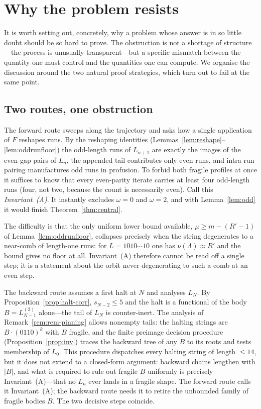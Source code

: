 \documentclass[11pt,reqno]{amsart}
\theoremstyle{plain}
\theoremstyle{definition}
\theoremstyle{remark}
\begin{document}
\section{Why the problem resists}\label{sec:resist}
It is worth setting out, concretely, why a problem whose answer is in so little doubt should be so hard to prove. The obstruction is not a shortage of structure---the process is unusually transparent---but a specific mismatch between the quantity one must control and the quantities one can compute. We organise the discussion around the two natural proof strategies, which turn out to fail at the same point.

\subsection{Two routes, one obstruction}\label{sec:13.1}
The forward route sweeps along the trajectory and asks how a single application of $F$ reshapes runs. By the reshaping identities (Lemmas~\ref{lem:reshape}--\ref{lem:oddrunfloor}) the odd-length runs of $L_{n+1}$ are exactly the images of the even-gap pairs of $L_n$, the appended tail contributes only even runs, and intra-run pairing manufactures odd runs in profusion. To forbid both fragile profiles at once it suffices to know that every even-parity iterate carries at least four odd-length runs (four, not two, because the count is necessarily even). Call this \emph{Invariant~(A)}. It instantly excludes $\omega=0$ and $\omega=2$, and with Lemma~\ref{lem:odd} it would finish Theorem~\ref{thm:central}.

The difficulty is that the only uniform lower bound available, $\mu\ge m-(R'-1)$ of Lemma~\ref{lem:oddrunfloor}, collapses precisely when the string degenerates to a near-comb of length-one runs: for $L=1010\cdots 10$ one has $\nu(\Lambda)\approx R'$ and the bound gives no floor at all. Invariant~(A) therefore cannot be read off a single step; it is a statement about the orbit never degenerating to such a comb at an even step.

The backward route assumes a first halt at $N$ and analyses $L_N$. By Proposition~\ref{prop:halt-corr}, $s_{N-2}\le 5$ and the halt is a functional of the body $B=L^{(2)}_{N-1}$ alone---the tail of $L_N$ is counter-inert. The analysis of Remark~\ref{rem:rem-pinning} allows nonempty tails: the halting strings are $B\cdot(0110)^k$ with $B$ fragile, and the finite preimage decision procedure (Proposition~\ref{prop:inv}) traces the backward tree of any $B$ to its roots and tests membership of $L_0$. This procedure dispatches every halting string of length $\le 14$, but it does not extend to a closed-form argument: backward chains lengthen with $|B|$, and what is required to rule out fragile $B$ uniformly is precisely Invariant~(A)---that no $L_n$ ever lands in a fragile shape. The forward route calls it Invariant~(A); the backward route needs it to retire the unbounded family of fragile bodies $B$. The two decisive steps coincide.
\end{document}

